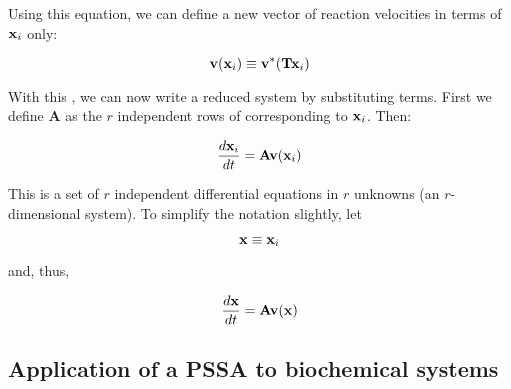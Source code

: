 Using this equation, we can define a new vector of reaction
velocities \vb in terms of $\mathbf{x}_i$ only:
\begin{linenomath}
\begin{equation*}
  \mathbf{v} ( \mathbf{x}_i ) \equiv \mathbf{v}^* ( \mathbf{T} \mathbf{x}_i )
\end{equation*}
\end{linenomath}
With this \vb, we can now write a reduced system by substituting
terms.  First we define $\mathbf{A}$ as the $r$ independent rows
of \Astar corresponding to $\mathbf{x}_i$.  Then:
\begin{linenomath}
\begin{equation*}
  \dfrac{d\mathbf{x}_i}{dt} = \mathbf{A} \mathbf{v} ( \mathbf{x}_i )
\end{equation*}
\end{linenomath}
This is a set of $r$ independent differential equations in $r$
unknowns (\ie an $r$-dimensional system).  To simplify the
notation slightly, let
\begin{linenomath}
\begin{equation*}
  \mathbf{x} \equiv \mathbf{x}_i
\end{equation*}
\end{linenomath}
and, thus,
\begin{linenomath}
\begin{equation*}
  \dfrac{d\mathbf{x}}{dt} = \mathbf{A} \mathbf{v} ( \mathbf{x} )
\end{equation*}
\end{linenomath}



\subsection*{Application of a PSSA to biochemical systems}

